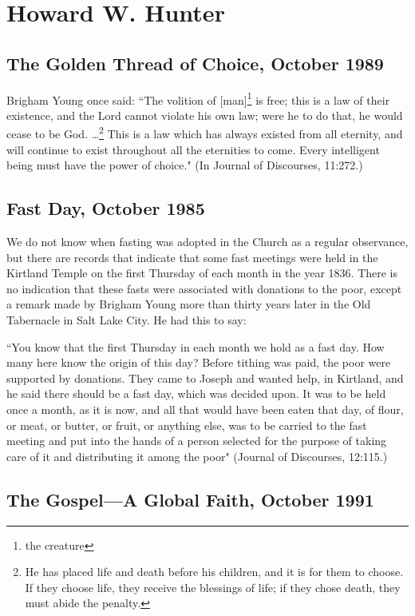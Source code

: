 \section{Howard W. Hunter}

\subsection{The Golden Thread of Choice, October 1989}

Brigham Young once said: ``The volition of [man]\footnote{the creature} is free; this is a law of their existence, and the Lord cannot violate his own law; were he to do that, he would cease to be God. …\footnote{He has placed life and death before his children, and it is for them to choose. If they choose life, they receive the blessings of life; if they chose death, they must abide the penalty.} This is a law which has always existed from all eternity, and will continue to exist throughout all the eternities to come. Every intelligent being must have the power of choice." (In Journal of Discourses, 11:272.)

\subsection{Fast Day, October 1985}

We do not know when fasting was adopted in the Church as a regular observance, but there are records that indicate that some fast meetings were held in the Kirtland Temple on the first Thursday of each month in the year 1836. There is no indication that these fasts were associated with donations to the poor, except a remark made by Brigham Young more than thirty years later in the Old Tabernacle in Salt Lake City. He had this to say:

``You know that the first Thursday in each month we hold as a fast day. How many here know the origin of this day? Before tithing was paid, the poor were supported by donations. They came to Joseph and wanted help, in Kirtland, and he said there should be a fast day, which was decided upon. It was to be held once a month, as it is now, and all that would have been eaten that day, of flour, or meat, or butter, or fruit, or anything else, was to be carried to the fast meeting and put into the hands of a person selected for the purpose of taking care of it and distributing it among the poor" (Journal of Discourses, 12:115.)

\subsection{The Gospel—A Global Faith, October 1991}

